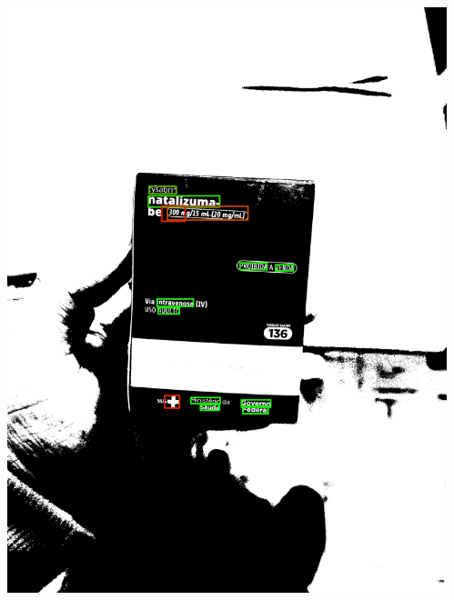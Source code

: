 \begin{frame}
\begin{columns}
\begin{column}{0.24\textwidth}
			\includegraphics[height=0.35\textheight]{../pictures/tysabri_rgb_r_only_thresh_boxes.jpg}
		\end{column}
		\begin{column}{0.24\textwidth}\centering

\end{column}
\end{columns}
\end{frame}
